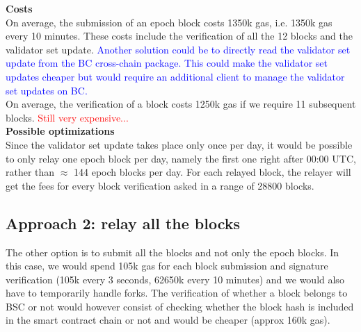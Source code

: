 \noindent
\textbf{Costs}\\
On average, the submission of an epoch block costs 1350k gas, i.e. 1350k gas every 10 minutes. These costs include the verification of all the 12 blocks and the validator set update. \textcolor{blue}{Another solution could be to directly read the validator set update from the BC cross-chain package. This could make the validator set updates cheaper but would require an additional client to manage the validator set updates on BC.}\\On average, the verification of a block costs 1250k gas if we require 11 subsequent blocks.
\textcolor{red}{Still very expensive...}\\


\noindent
\textbf{Possible optimizations}\\
Since the validator set update takes place only once per day, it would be possible to only relay one epoch block per day, namely the first one right after 00:00 UTC, rather than $\approx$ 144 epoch blocks per day. For each relayed block, the relayer will get the fees for every block verification asked in a range of 28800 blocks.


\subsection{Approach 2: relay all the blocks}
The other option is to submit all the blocks and not only the epoch blocks. In this case, we would spend 105k gas for each block submission and signature verification (105k every 3 seconds, 62650k every 10 minutes) and we would also have to temporarily handle forks. The verification of whether a block belongs to BSC or not would however consist of checking whether the block hash is included in the smart contract chain or not and would be cheaper (approx 160k gas).

